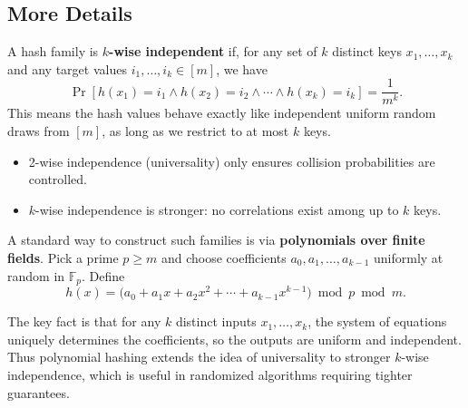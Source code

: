 \documentclass[11pt]{article}
\begin{document}
\subsection*{More Details}
A hash family is \textbf{$k$-wise independent} if, for any set of $k$ distinct keys 
$x_1,\dots,x_k$ and any target values $i_1,\dots,i_k \in [m]$, we have
\[
\Pr[h(x_1)=i_1 \wedge h(x_2)=i_2 \wedge \cdots \wedge h(x_k)=i_k] = \frac{1}{m^k}.
\]
This means the hash values behave exactly like independent uniform random draws from $[m]$,
as long as we restrict to at most $k$ keys.

\begin{itemize}
  \item 2-wise independence (universality) only ensures collision probabilities are controlled. 
  \item $k$-wise independence is stronger: no correlations exist among up to $k$ keys.
\end{itemize}

A standard way to construct such families is via \textbf{polynomials over finite fields}. 
Pick a prime $p \geq m$ and choose coefficients $a_0,a_1,\dots,a_{k-1}$ uniformly at random in $\mathbb{F}_p$.
Define
\[
h(x) = \Big( a_0 + a_1 x + a_2 x^2 + \cdots + a_{k-1} x^{k-1} \Big) \bmod p \bmod m .
\]

The key fact is that for any $k$ distinct inputs $x_1,\dots,x_k$, the system of equations uniquely determines 
the coefficients, so the outputs are uniform and independent. Thus polynomial hashing extends the idea of universality 
to stronger $k$-wise independence, which is useful in randomized algorithms requiring tighter guarantees.


\clearpage


\nocite{*}



\end{document}
